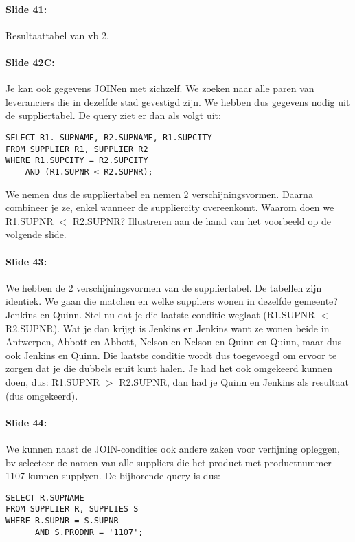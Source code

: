 \documentclass[10pt,a4paper]{report}
\begin{document}
\paragraph{Slide 41:}Resultaattabel van vb 2.

\paragraph{Slide 42C:}Je kan ook gegevens JOINen met zichzelf. We zoeken naar alle paren van leveranciers die in dezelfde stad gevestigd zijn. We hebben dus gegevens nodig uit de suppliertabel. De query ziet er dan als volgt uit:
\begin{verbatim}
SELECT R1. SUPNAME, R2.SUPNAME, R1.SUPCITY
FROM SUPPLIER R1, SUPPLIER R2
WHERE R1.SUPCITY = R2.SUPCITY
    AND (R1.SUPNR < R2.SUPNR);
\end{verbatim}
We nemen dus de suppliertabel en nemen 2 verschijningsvormen. Daarna combineer je ze, enkel wanneer de suppliercity overeenkomt. Waarom doen we R1.SUPNR $<$ R2.SUPNR? Illustreren aan de hand van het voorbeeld op de volgende slide.

\paragraph{Slide 43:}We hebben de 2 verschijningsvormen van de suppliertabel. De tabellen zijn identiek. We gaan die matchen en welke suppliers wonen in dezelfde gemeente? Jenkins en Quinn. Stel nu dat je die laatste conditie weglaat (R1.SUPNR $<$ R2.SUPNR). Wat je dan krijgt is Jenkins en Jenkins want ze wonen beide in Antwerpen, Abbott en Abbott, Nelson en Nelson en Quinn en Quinn, maar dus ook Jenkins en Quinn. Die laatste conditie wordt dus toegevoegd om ervoor te zorgen dat je die dubbels eruit kunt halen. Je had het ook omgekeerd kunnen doen, dus: R1.SUPNR $>$ R2.SUPNR, dan had je Quinn en Jenkins als resultaat (dus omgekeerd).

\paragraph{Slide 44:}We kunnen naast de JOIN-condities ook andere zaken voor verfijning opleggen, bv selecteer de namen van alle suppliers die het product met productnummer 1107 kunnen supplyen. De bijhorende query is dus:

\begin{verbatim}
SELECT R.SUPNAME
FROM SUPPLIER R, SUPPLIES S
WHERE R.SUPNR = S.SUPNR
      AND S.PRODNR = '1107';
\end{verbatim}
\end{document}
